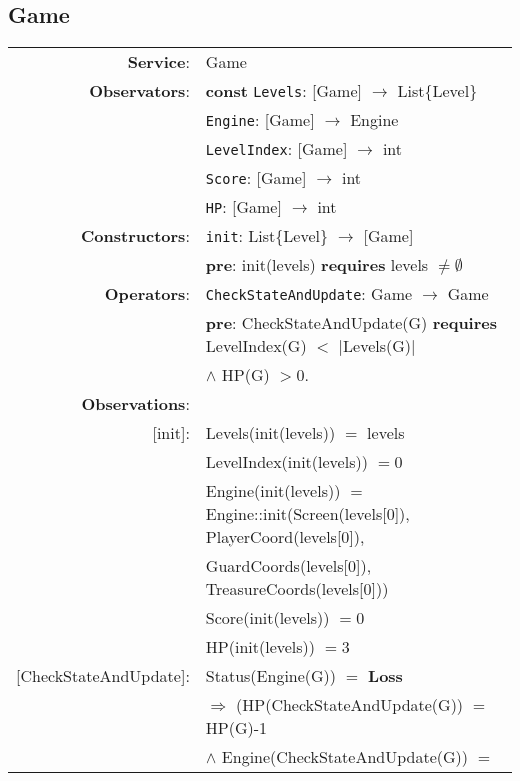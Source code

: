 \documentclass[8pt]{article}
\begin{document}
\subsection{Game}
{\small
\begin{longtable}{rl}
  \textbf{Service}:&\textrm{Game}\\
  \textbf{Observators}:& \textbf{const} \texttt{Levels}: \textrm{[Game]} $\rightarrow$ \textrm{List\{Level\}}\\
  & \texttt{Engine}: \textrm{[Game]} $\rightarrow$ \textrm{Engine}\\
  & \texttt{LevelIndex}: \textrm{[Game]} $\rightarrow$ \textrm{int}\\
  & \texttt{Score}: \textrm{[Game]} $\rightarrow$ \textrm{int}\\
  & \texttt{HP}: \textrm{[Game]} $\rightarrow$ \textrm{int}\\
  \textbf{Constructors}:& \texttt{init}: \textrm{List\{Level\}} $\rightarrow$ \textrm{[Game]}\\
  &\quad\quad \textbf{pre}: \textrm{init(levels)} \textbf{requires} \textrm{levels} $\neq \emptyset$\\
  \textbf{Operators}:& \texttt{CheckStateAndUpdate}: \textrm{Game} $\rightarrow$ \textrm{Game}\\
  & \quad\quad \textbf{pre}: \textrm{CheckStateAndUpdate(G)} \textbf{requires} \textrm{LevelIndex(G)} $<$ \textrm{$|$Levels(G)$|$}\\
  & \quad\quad\quad\quad $\land$ \textrm{HP(G)} $> 0$.\\
  \textbf{Observations}:&\\
  \textrm{[init]}:& \textrm{Levels(init(levels))} $=$ \textrm{levels}\\
  & \textrm{LevelIndex(init(levels))} $ = 0$\\
  & \textrm{Engine(init(levels))} $ = $ \textrm{Engine::init(Screen(levels[0]), PlayerCoord(levels[0]),}\\
  & \quad\quad\quad\quad \textrm{GuardCoords(levels[0]), TreasureCoords(levels[0]))}\\
  & \textrm{Score(init(levels))} $ = 0$\\
  & \textrm{HP(init(levels))} $ = 3$\\
  \textrm{[CheckStateAndUpdate]}:& \textrm{Status(Engine(G))} $=$ \textbf{Loss}\\
  & \quad\quad $\Rightarrow$ (\textrm{HP(CheckStateAndUpdate(G))} $=$ \textrm{HP(G)-1}\\
  & \quad\quad\quad\quad $\land$ \textrm{Engine(CheckStateAndUpdate(G))} $=$ \\

\end{longtable}}
\end{document}
